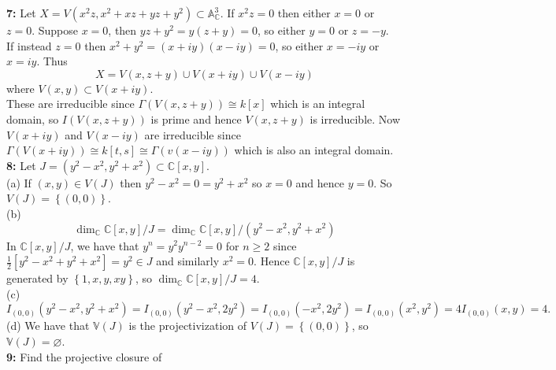 \documentclass[a4paper]{article}
\begin{document}
     \textbf{7:} Let $X = V\left( x^2 z, x^2 + xz + yz + y^2 \right) 
     \subset \mathbb{A}_{\mathbb{C}}^3$. If $x^2 z = 0$ then either
     $x = 0$ or $z = 0$. Suppose $x = 0$, then
     $yz + y^2 = y (z+y) = 0$, so either $y = 0$ or $z = -y$.\\
     If instead $z = 0$ then
     $x^2 + y^2 = (x+iy)(x-iy) = 0$, so either $x = -iy$ or $x = iy$. Thus
     \[
    X = V(x, z+y) \cup V(x+iy) \cup V(x-iy)
     \] 
     where $V(x,y) \subset V(x+iy)$.\\
     These are irreducible since $\Gamma(V(x, z+y)) \cong k\left[ x \right]
     $ which is an integral domain, so
     $I\left( V\left( x, z+y \right)  \right) $ is prime and hence
     $V(x, z+y)$ is irreducible. Now
     $V(x+iy)$ and $V(x-iy)$ are irreducible since
     $\Gamma(V(x+iy)) \cong k\left[ t,s \right] \cong
     \Gamma(v(x-iy))$ which is also an integral domain.\\
     \linebreak
     \textbf{8:} Let $J = \left( y^2 - x^2, y^2 + x^2 \right) 
     \subset \mathbb{C}\left[ x,y \right] $.\\
     \linebreak
     (a) If $(x,y) \in V(J)$ then $y^2 - x^2 = 0 = y^2 + x^2$ so
     $x = 0$ and hence $y = 0$. So
     $V(J) = \left\{ (0,0) \right\} $.\\
     \linebreak
     (b) 
     \[
     \dim_{\mathbb{C}} \mathbb{C}\left[ x,y \right] / J
     = \dim_{\mathbb{C}}\mathbb{C}\left[ x,y \right] / \left( y^2 - x^2 , y^2
     + x^2 \right) 
     \]
     In $\mathbb{C}\left[ x,y \right] / J$, we have that
     $y^{n} = y^{2} y^{n-2} = 0$ for $n\ge 2$ since $\frac{1}{2} \left[ y^2 -x^2 + y^2 +x^2 \right] 
     = y^2 \in J$ and
     similarly  $x^{2} = 0$. Hence
      $\mathbb{C}\left[ x,y \right] / J$ is generated by
      $\left\{ 1, x, y, xy \right\} $, so
      $\dim_{\mathbb{C}} \mathbb{C}\left[ x,y \right] /J = 4$.\\
      \linebreak
      (c) 
      \[
      I_{(0,0)}\left( y^2 - x^2, y^2 + x^2 \right) 
      = I_{(0,0)}\left( y^2 - x^2 , 2y^2 \right) 
      = I_{(0,0)}\left( -x^2 , 2y^2 \right) 
      = I_{(0,0)}(x^2 , y^2)
      = 4 I_{(0,0)}(x,y) = 4.
      \] 
      (d) We have that
      $\mathbb{V}(J)$ is the projectivization of $V(J) = \left\{ (0,0) \right\}
      $, so
      $\mathbb{V}(J) = \varnothing$.\\
      \linebreak
      \textbf{9:} Find the projective closure of
\end{document}
